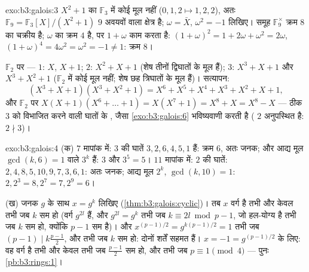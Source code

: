 \begin{solution}{exo:b3:galois:3}
$X^2 + 1$ का $\mathbb F_3$ में कोई मूल नहीं ($0, 1, 2 \mapsto 1, 2,
2$), अतः $\mathbb F_9 = \mathbb F_3[X]/(X^2+1)$ $9$ अवयवों वाला
क्षेत्र है; $\omega = \bar X$, $\omega^2 = -1$ लिखिए। समूह $\mathbb F_9^\times$ क्रम $8$ का चक्रीय है;
$\omega$ का क्रम $4$ है, पर $1 + \omega$ काम करता है: $(1+\omega)^2 = 1 + 2\omega +
\omega^2 = 2\omega$, $(1+\omega)^4 = 4\omega^2 = \omega^2 = -1
\ne 1$: क्रम $8$।

$\mathbb F_2$ पर ---  $1$: $X$, $X + 1$;  $2$: $X^2 + X + 1$ (शेष तीनों द्विघातों
के मूल हैं);  $3$: $X^3 + X + 1$ और $X^3 + X^2 + 1$ ($\mathbb
F_2$ में कोई मूल नहीं; शेष छह
त्रिघातों के मूल हैं)। सत्यापन:
\[
(X^3{+}X{+}1)(X^3{+}X^2{+}1) = X^6 + X^5 + X^4 + X^3 + X^2 + X
+ 1,
\]
और $\mathbb F_2$ पर $X(X{+}1)(X^6 + \dots + 1) = X(X^7 + 1) = X^8 + X = X^8 -
X$ --- ठीक $3$ को विभाजित करने वाली घातों के ,
जैसा \cref{exo:b3:galois:6} भविष्यवाणी करती है ( $2$ अनुपस्थित है: $2 \nmid 3$)।
\end{solution}

\begin{solution}{exo:b3:galois:4}
(क) $7$ मापांक में: $3$ की घातें $3, 2, 6, 4, 5, 1$ हैं: क्रम $6$, अतः जनक;
और आद्य मूल $\gcd(k, 6) = 1$ वाले $3^k$ हैं: $3$ और $3^5 = 5$। $11$ मापांक में:
$2$ की घातें: $2, 4, 8, 5, 10, 9, 7, 3, 6, 1$: अतः जनक; आद्य मूल $2^k$, $\gcd(k, 10) = 1$: $2, 2^3 = 8, 2^7 = 7, 2^9 = 6$।

(ख) जनक $g$ के साथ $x = g^k$ लिखिए (\cref{thm:b3:galois:cyclic})। तब $x$ वर्ग है तभी और
केवल तभी जब $k$ सम हो (वर्ग $g^{2l}$ हैं, और $g^{2l} = g^{k}$ तभी जब $k
\equiv 2l \bmod p-1$, जो
हल-योग्य है तभी जब $k$ सम हो, क्योंकि $p - 1$ सम है)। और $x^{(p-1)/2} = g^{k(p-1)/2} = 1$ तभी
जब $(p-1) \mid
k\frac{p-1}2$, और तभी जब $k$ सम हो: दोनों शर्तें सहमत हैं। $x =
-1 = g^{(p-1)/2}$ के
लिए: वह वर्ग है तभी और केवल तभी जब $\frac{p-1}2$ सम हो, और तभी जब $p \equiv 1 \pmod 4$
--- पुनः \cref{pb:b3:rings:1}।
\end{solution}

